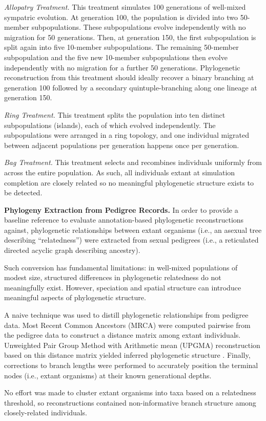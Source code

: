 \textit{Allopatry Treatment.}
This treatment simulates 100 generations of well-mixed sympatric evolution.
At generation 100, the population is divided into two 50-member subpopulations.
These subpopulations evolve independently with no migration for 50 generations.
Then, at generation 150, the first subpopulation is split again into five 10-member subpopulations.
The remaining 50-member subpopulation and the five new 10-member subpopulations then evolve independently with no migration for a further 50 generations.
Phylogenetic reconstruction from this treatment should ideally recover a binary branching at generation 100 followed by a secondary quintuple-branching along one lineage at generation 150.

\textit{Ring Treatment.}
This treatment splits the population into ten distinct subpopulations (islands), each of which evolved independently.
The subpopulations were arranged in a ring topology, and one individual migrated between adjacent populations per generation happens once per generation.

\textit{Bag Treatment.}
This treatment selects and recombines individuals uniformly from across the entire population.
As such, all individuals extant at simulation completion are closely related so no meaningful phylogenetic structure exists to be detected.

\textbf{Phylogeny Extraction from Pedigree Records.}
In order to provide a baseline reference to evaluate annotation-based phylogenetic reconstructions against, phylogenetic relationships between extant organisms (i.e., an asexual tree describing ``relatedness'') were extracted from sexual pedigrees (i.e., a reticulated directed acyclic graph describing ancestry).

Such conversion has fundamental limitations: in well-mixed populations of modest size, structured differences in phylogenetic relatedness do not meaningfully exist.
However, speciation and spatial structure can introduce meaningful aspects of phylogenetic structure.

A naive technique was used to distill phylogenetic relationships from pedigree data.
Most Recent Common Ancestors (MRCA) were computed pairwise from the pedigree data to construct a distance matrix among extant individuals.
Unweighted Pair Group Method with Arithmetic mean (UPGMA) reconstruction based on this distance matrix yielded inferred phylogenetic structure \citep{sokal1958university}.
Finally, corrections to branch lengths were performed to accurately position the terminal nodes (i.e., extant organisms) at their known generational depths.

No effort was made to cluster extant organisms into taxa based on a relatedness threshold, so reconstructions contained non-informative branch structure among closely-related individuals.
